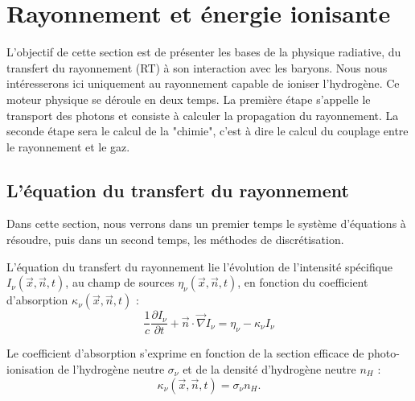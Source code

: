 \section{Rayonnement et énergie ionisante}
\label{sec:rad_solver}

L'objectif de cette section est de présenter les bases de la physique radiative, du transfert du rayonnement (RT) à son interaction avec les baryons.
Nous nous intéresserons ici uniquement au rayonnement capable de ioniser l'hydrogène.
Ce moteur physique se déroule en deux temps.
La première étape s'appelle le transport des photons et consiste à calculer la propagation du rayonnement.
La seconde étape sera le calcul de la "chimie", c'est à dire le calcul du couplage entre le rayonnement et le gaz.

\subsection{L'équation du transfert du rayonnement}

Dans cette section, nous verrons dans un premier temps le système d'équations à résoudre, puis dans un second temps, les méthodes de discrétisation.

L'équation du transfert du rayonnement lie l'évolution de l'intensité spécifique $I_\nu(\vec{x},\vec{n},t)$, au champ de sources $\eta_\nu(\vec{x},\vec{n},t)$, en fonction du coefficient d'absorption $\kappa_\nu(\vec{x},\vec{n},t)$ :
\begin{equation}
\frac{1}{c} \frac{\partial I_\nu}{\partial t} + \vec{n}\cdot \vec{\nabla} I_\nu = \eta_\nu - \kappa_\nu I_\nu 
\label{eq:rad}
\end{equation}

Le coefficient d'absorption s'exprime en fonction de la section efficace de photo-ionisation de l'hydrogène neutre $\sigma_\nu$ et de la densité d'hydrogène neutre $n_H$ :
\begin{equation}
\kappa_\nu(\vec{x},\vec{n},t) = \sigma_\nu n_H.
\end{equation}

